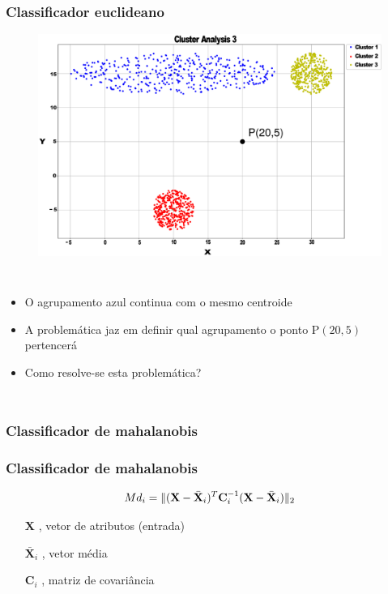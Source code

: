 \documentclass[aspectratio=10]{beamer} %
\begin{document}
\begin{frame}
	\frametitle{Classificador euclideano}
	\begin{figure}[H]
		\includegraphics[scale=0.12]{Imagens/clusteranalise3.eps}
	\end{figure}
	
	\begin{columns}
		\footnotesize
		\justifying
		\begin{itemize}
			\item O agrupamento azul continua com o mesmo centroide
			\pause 
			\item A problemática jaz em definir qual agrupamento o ponto  P$(20,5)$ pertencerá 
			\pause
			\item Como resolve-se esta problemática?
		\end{itemize}
	\end{columns}
\end{frame}

\subsubsection{Classificador de mahalanobis}

\begin{frame}
	\frametitle{Classificador de mahalanobis}
	\begin{tcolorbox}[colback=gray!5,colframe=blue!40!black,title=Definição]
		\begin{equation}
		Md_{i}=\Arrowvert(\textbf{X}-\bar{\textbf{X}}_{i})^{T}\textbf{C}_{i}^{-1}(\textbf{X}-\bar{\textbf{X}}_{i})\Arrowvert_{2}\nonumber
		\label{eq5}
		\end{equation}
	\end{tcolorbox}
	\pause
	\begin{itemize}
		\centering
		\item[$\textbf{X}$], vetor de atributos (entrada)
		\pause
		\item[$\bar{\textbf{X}}_{i}$], vetor média
		\pause
		\item[$\textbf{C}_{i}$], matriz de covariância 
	\end{itemize}
\end{frame}
\end{document}
